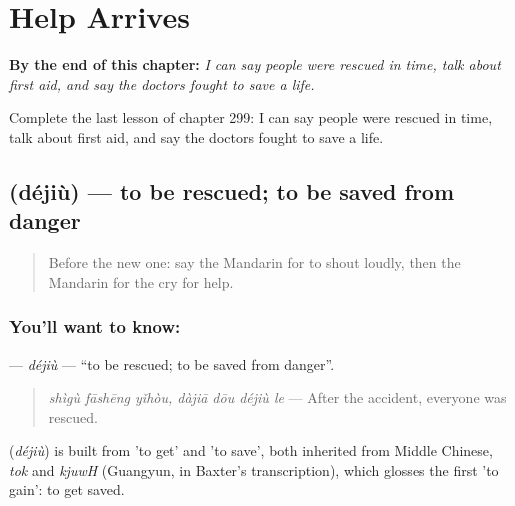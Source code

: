 
\chapter{Help Arrives}
\label{ch:zh-help-arrives}

\begin{chapteropening}
\textbf{By the end of this chapter:} \emph{I can say people were rescued in time, talk about first aid, and say the doctors fought to save a life.}

Complete the last lesson of chapter 299: I can say people were rescued in time, talk about first aid, and say the doctors fought to save a life.
\end{chapteropening}

\section[\texorpdfstring{\zh{得救} (déjiù)}{得救 (déjiù)}]{ (déjiù) — to be rescued; to be saved from danger}

\label{lesson:ZH-C299-dejiu}



\begin{quote}
Before the new one: say the Mandarin for to shout loudly, then the Mandarin for the cry for help.
\end{quote}

\subsection*{You'll want to know: }
\textbf{} — \emph{déjiù} — \textquotedblleft{}to be rescued; to be saved from danger\textquotedblright{}.

\begin{quote}
\textbf{} \emph{shìgù fāshēng yǐhòu, dàjiā dōu déjiù le} — After the accident, everyone was rescued.
\end{quote}

\begin{cousinweb}
\textbf{} (\emph{déjiù}) is built from  'to get' and  'to save', both inherited from Middle Chinese, \emph{tok} and \emph{kjuwH} (Guangyun, in Baxter's transcription), which glosses the first 'to gain': to get saved.
\end{cousinweb}

